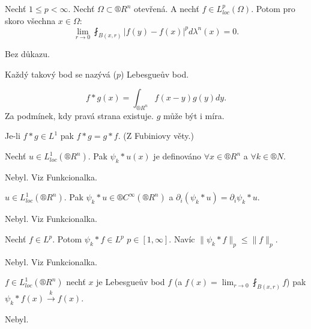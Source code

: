 \documentclass[12pt]{article}					%
\begin{document}
\begin{veta}
	Nechť $1 ≤ p < ∞$. Nechť $Ω \subset ®R^n$ otevřená. A nechť $f \in L^p_{loc}(Ω)$. Potom pro skoro všechna $x \in Ω$:
	$$ \lim_{r \rightarrow 0} \fint_{B(x, r)} |f(y) - f(x)|^p dλ^n(x) = 0. $$

	\begin{dukazin}
		Bez důkazu.
	\end{dukazin}
\end{veta}

\begin{definice}
	Každý takový bod se nazývá ($p$) Lebesgueův bod.
\end{definice}

\begin{definice}[Konvoluce]
	$$ f*g(x) = \int_{®R^n} f(x - y)g(y) dy. $$
	Za podmínek, kdy pravá strana existuje. $g$ může být i míra.

	\begin{poznamka}
		Je-li $f * g \in L^1$ pak $f*g=g*f$. (Z Fubiniovy věty.)
	\end{poznamka}
\end{definice}

\begin{tvrzeni}
	Nechť $u \in L^1_{loc}(®R^n)$. Pak $ψ_k*u(x)$ je definováno $\forall x \in ®R^n$ a $\forall k \in ®N$.

	\begin{dukazin}
		Nebyl. Viz Funkcionalka.
	\end{dukazin}
\end{tvrzeni}

\begin{veta}
	$u \in L^1_{loc}(®R^n)$. Pak $ψ_k * u \in ®C^∞(®R^n)$ a $\partial_i(ψ_k*u) = \partial_iψ_k*u$.

	\begin{dukazin}
		Nebyl. Viz Funkcionalka.
	\end{dukazin}
\end{veta}

\begin{lemma}
	Nechť $f \in L^p$. Potom $ψ_k * f \in L^p$ $p \in [1, ∞]$. Navíc $\|ψ_k*f\|_p ≤ \|f\|_p$.

	\begin{dukazin}
		Nebyl. Viz Funkcionalka.
	\end{dukazin}
\end{lemma}

\begin{veta}
	$f \in L^1_{loc}(®R^n)$ nechť $x$ je Lebesgueův bod $f$ (a $f(x) = \lim_{r \rightarrow 0} \fint_{B(x, r)} f$) pak $ψ_k * f(x) \overset{k} \rightarrow f(x)$.

	\begin{dukazin}
		Nebyl.
	\end{dukazin}
\end{veta}
\end{document}
